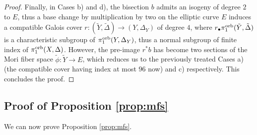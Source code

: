 \documentclass{amsart}
\theoremstyle{definition}
\theoremstyle{remark}
\numberwithin{equation}{section}
\begin{document}
\begin{proof}
Finally, in Cases b) and d), the bisection $b$ admits an isogeny of degree $2$ to $E$, thus a base change by multiplication by two on the elliptic curve $E$ induces a compatible Galois cover $r:(\tilde{Y},\tilde{\Delta})\to (Y,\Delta_Y)$ of degree $4$, where $r_{\bullet}\pi_1^{\rm orb}(\tilde{Y},\tilde{\Delta})$ is a characteristic subgroup of $\pi_1^{\rm orb}(Y,\Delta_Y)$, thus a normal subgroup of finite index of $\pi_1^{\rm orb}(X,\Delta)$. However, the pre-image $r^*b$ has become two sections of the Mori fiber space $\tilde{\phi}:\tilde{Y}\to E$, which reduces us to the previously treated Cases a) (the compatible cover having index at most $96$ now) and c) respectively. This concludes the proof.
\end{proof}

\subsection{Proof of Proposition \ref{prop:mfs}}
We can now prove Proposition \ref{prop:mfs}.
\end{document}
